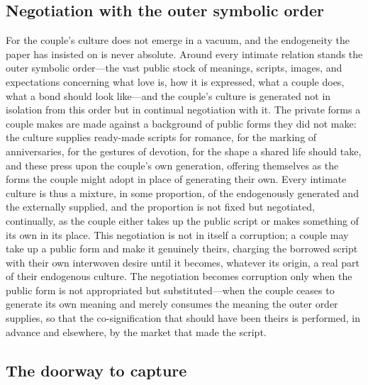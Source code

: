 \subsection*{Negotiation with the outer symbolic order}

For the couple's culture does not emerge in a vacuum, and the endogeneity the paper has insisted on is never absolute. Around every intimate relation stands the outer symbolic order---the vast public stock of meanings, scripts, images, and expectations concerning what love is, how it is expressed, what a couple does, what a bond should look like---and the couple's culture is generated not in isolation from this order but in continual negotiation with it. The private forms a couple makes are made against a background of public forms they did not make: the culture supplies ready-made scripts for romance, for the marking of anniversaries, for the gestures of devotion, for the shape a shared life should take, and these press upon the couple's own generation, offering themselves as the forms the couple might adopt in place of generating their own. Every intimate culture is thus a mixture, in some proportion, of the endogenously generated and the externally supplied, and the proportion is not fixed but negotiated, continually, as the couple either takes up the public script or makes something of its own in its place. This negotiation is not in itself a corruption; a couple may take up a public form and make it genuinely theirs, charging the borrowed script with their own interwoven desire until it becomes, whatever its origin, a real part of their endogenous culture. The negotiation becomes corruption only when the public form is not appropriated but substituted---when the couple ceases to generate its own meaning and merely consumes the meaning the outer order supplies, so that the co-signification that should have been theirs is performed, in advance and elsewhere, by the market that made the script.

\subsection*{The doorway to capture}

